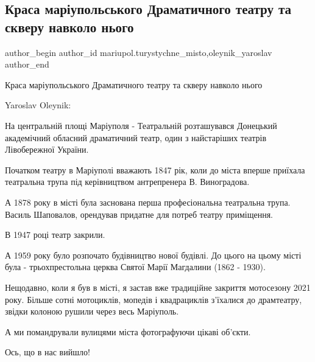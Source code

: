  
 
 
 
 

\subsection{Краса маріупольського Драматичного театру та скверу навколо нього}
\label{sec:29_10_2021.fb.mariupol.turystychne_misto.1.krasa_mariupolskogo_dramatychnogo_teatru_ta_skveru}
 
\ifcmt
 author_begin
   author_id mariupol.turystychne_misto,oleynik_yaroslav
 author_end
\fi

Краса маріупольського Драматичного театру та скверу навколо нього 🥰

Yaroslav Oleynik:

На центральній площі Маріуполя - Театральній розташувався Донецький академічний
обласний драматичний театр, один з найстаріших театрів Лівобережної України.

Початком театру в Маріуполі вважають 1847 рік, коли до міста вперше приїхала
театральна трупа під керівництвом антрепренера В. Виноградова. 

А 1878 року в місті була заснована  перша професіональна театральна трупа.
Василь Шаповалов, орендував придатне для потреб театру приміщення.

В 1947 році театр закрили.

А 1959 року було розпочато будівництво нової будівлі. До цього на цьому місті
була -  трьохпрестольна церква Святої Марії Магдалини (1862 - 1930).

Нещодавно, коли я був в місті, я застав вже традиційне закриття мотосезону 2021
року. Більше сотні мотоциклів, мопедів і квадрациклів з'їхалися до драмтеатру,
звідки колоною рушили через весь Маріуполь.

А ми помандрували вулицями міста фотографуючи цікаві об'єкти.

Ось, що в нас вийшло!
